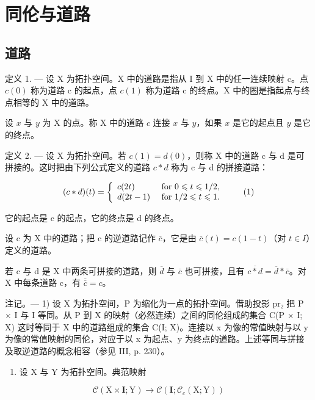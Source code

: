 \section{同伦与道路}

\subsection{道路}

定义 1. --- 设 X 为拓扑空间。X 中的道路是指从 I 到 X 中的任一连续映射 c。点 \(c(0)\) 称为道路 c 的起点，点 \(c(1)\) 称为道路 c 的终点。X 中的圈是指起点与终点相等的 X 中的道路。

设 \(x\) 与 \(y\) 为 X 的点。称 X 中的道路 \(c\) 连接 \(x\) 与 \(y\)，如果 \(x\) 是它的起点且 \(y\) 是它的终点。

定义 2. --- 设 X 为拓扑空间。若 \(c(1) = d(0)\)，则称 X 中的道路 c 与 d 是可拼接的。这时把由下列公式定义的道路 \(c*d\) 称为 c 与 d 的拼接道路：

\[
(c * d) (t) = \left\{ \begin{array}{l l} c (2 t) & \text { for } 0 \leqslant t \leqslant 1 / 2, \\ d (2 t - 1) & \text { for } 1 / 2 \leqslant t \leqslant 1. \end{array} \right.\tag{1}
\]

它的起点是 c 的起点，它的终点是 d 的终点。

设 c 为 X 中的道路；把 c 的逆道路记作 \(\overline{c}\)，它是由 \(\overline{c}(t) = c(1 - t)\)（对 \(t \in I\)）定义的道路。

若 c 与 d 是 X 中两条可拼接的道路，则 \(\overline{d}\) 与 \(\overline{c}\) 也可拼接，且有 \(\overline{c*d} = \overline{d} * \overline{c}\)。对 X 中每条道路 c，有 \(\overline{\overline{c}} = c\)。

注记。--- 1) 设 X 为拓扑空间，P 为缩化为一点的拓扑空间。借助投影 pr₂ 把 P × I 与 I 等同。从 P 到 X 的映射（必然连续）之间的同伦组成的集合 C(P × I; X) 这时等同于 X 中的道路组成的集合 C(I; X)。连接以 x 为像的常值映射与以 y 为像的常值映射的同伦，对应于以 x 为起点、y 为终点的道路。上述等同与拼接及取逆道路的概念相容（参见 III, p. 230）。

\begin{enumerate}
\def\labelenumi{\arabic{enumi})}
\setcounter{enumi}{1}
\tightlist
\item
  设 X 与 Y 为拓扑空间。典范映射
\end{enumerate}

\[
\mathcal {C} (\mathrm{X} \times \mathbf {I}; \mathrm{Y}) \rightarrow \mathcal {C} (\mathbf {I}; \mathcal {C} _ {c} (\mathrm{X}; \mathrm{Y}))
\]

